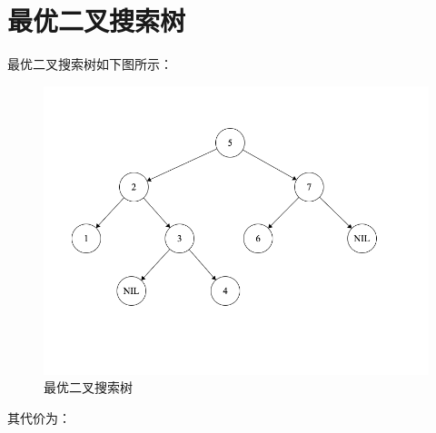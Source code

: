 \documentclass[]{report}
\begin{document}
	\section{最优二叉搜索树}
	最优二叉搜索树如下图所示：
	\begin{figure}
		\centering
		\begin{minipage}{40em}
			\centering
			\includegraphics[scale = 0.4]{images/3_Optimal_BST.png}
			\caption{最优二叉搜索树}
		\end{minipage}
	\end{figure}\par
	其代价为：
\end{document}
